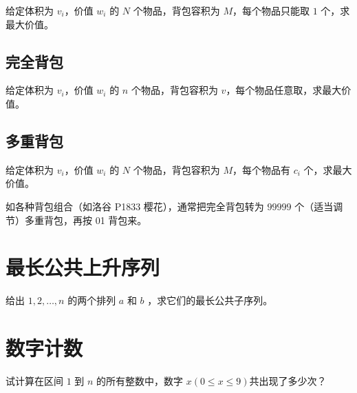 \documentclass[cn,11pt,blue,normal,founder]{elegantbook}
\begin{document}
给定体积为 $v_i$，价值 $w_i$ 的 $N$ 个物品，背包容积为 $M$，每个物品只能取 $1$ 个，求最大价值。



\subsection{完全背包}

给定体积为 $v_i$，价值 $w_i$ 的 $n$ 个物品，背包容积为 $v$，每个物品任意取，求最大价值。



\subsection{多重背包}

给定体积为 $v_i$，价值 $w_i$ 的 $N$ 个物品，背包容积为 $M$，每个物品有 $c_i$ 个，求最大价值。

如各种背包组合（如洛谷 P1833 樱花），通常把完全背包转为 $99999$ 个（适当调节）多重背包，再按 01 背包来。



\section{最长公共上升序列}

给出 $1,2,\ldots,n$ 的两个排列 $a$ 和 $b$ ，求它们的最长公共子序列。



\section{数字计数}

试计算在区间 $1$ 到 $n$ 的所有整数中，数字 $x(0 \leqslant x \leqslant 9)$共出现了多少次？


\end{document}
